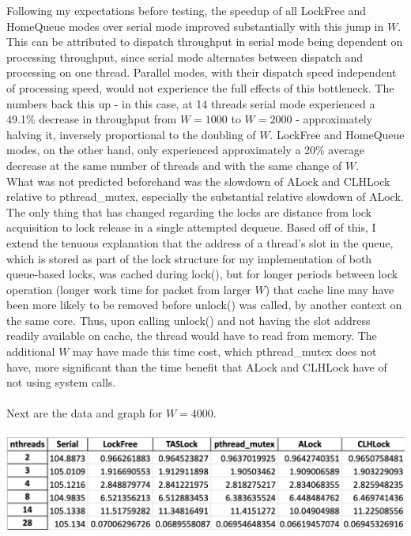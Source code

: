 \documentclass{article}
\begin{document}
\begin{adjustwidth}{-2cm}{-2cm}
Following my expectations before testing, the speedup of all LockFree and HomeQueue modes over serial mode improved substantially with this jump in $W$. This can be attributed to dispatch throughput in serial mode being dependent on processing throughput, since serial mode alternates between dispatch and processing on one thread. Parallel modes, with their dispatch speed independent of processing speed, would not experience the full effects of this bottleneck. The numbers back this up - in this case, at 14 threads serial mode experienced a 49.1\% decrease in throughput from $W=1000$ to $W=2000$ - approximately halving it, inversely proportional to the doubling of $W$. LockFree and HomeQueue modes, on the other hand, only experienced approximately a 20\% average decrease at the same number of threads and with the same change of $W$.\\
What was not predicted beforehand was the slowdown of ALock and CLHLock relative to pthread\_mutex, especially the substantial relative slowdown of ALock. The only thing that has changed regarding the locks are distance from lock acquisition to lock release in a single attempted dequeue. Based off of this, I extend the tenuous explanation that the address of a thread's slot in the queue, which is stored as part of the lock structure for my implementation of both queue-based locks, was cached during lock(), but for longer periods between lock operation (longer work time for packet from larger $W$) that cache line may have been more likely to be removed before unlock() was called, by another context on the same core. Thus, upon calling unlock() and not having the slot address readily available on cache, the thread would have to read from memory. The additional $W$ may have made this time cost, which pthread\_mutex does not have, more significant than the time benefit that ALock and CLHLock have of not using system calls.\\
\null\\Next are the data and graph for $W=4000$.\\
\null\\
\includegraphics[width=\linewidth]{b_uni4000Data.png}\\ \null\\

\end{adjustwidth}
\end{document}
